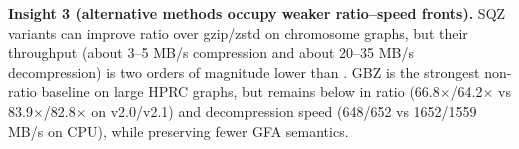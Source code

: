 \noindent \textbf{Insight 3 (alternative methods occupy weaker ratio--speed fronts).}
SQZ variants can improve ratio over gzip/zstd on chromosome graphs, but their throughput (about 3--5 MB/s compression and about 20--35 MB/s decompression) is two orders of magnitude lower than \gfaz.
GBZ is the strongest non-\gfaz ratio baseline on large HPRC graphs, but remains below \gfaz in ratio (66.8$\times$/64.2$\times$ vs 83.9$\times$/82.8$\times$ on v2.0/v2.1) and decompression speed (648/652 vs 1652/1559 MB/s on CPU), while preserving fewer GFA semantics.

\begin{table}[t]
  \centering
  \scriptsize
  \setlength{\tabcolsep}{3pt}
  \renewcommand{\arraystretch}{1.05}
  \caption{Random-access evaluation using \texttt{extract-traversal}. We measure the time and peak memory required to reconstruct only 1, 4, or 16 selected paths/walks from an existing \texttt{.gfaz} file.}
  \label{tab:random-access}
\end{table}

